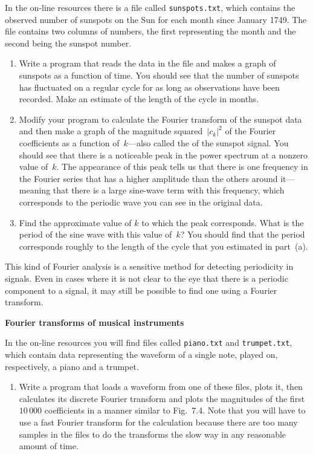 \documentclass[12pt]{article}
\begin{document}
\begin{exercises}
\exskip In the on-line resources there is a file called
\verb|sunspots.txt|, which contains the observed number of sunspots on the
Sun for each month since January 1749.  The file contains two columns of
numbers, the first representing the month and the second being the sunspot
number.
\begin{enumerate}\setlength{\itemsep}{0pt}
\item Write a program that reads the data in the file and makes a graph of
  sunspots as a function of time.  You should see that the number of
  sunspots has fluctuated on a regular cycle for as long as observations
  have been recorded.  Make an estimate of the length of the cycle in
  months.
\item Modify your program to calculate the Fourier transform of the sunspot
  data and then make a graph of the magnitude squared~$|c_k|^2$ of the
  Fourier coefficients as a function of~$k$---also called the
   of the sunspot signal.  You should see that
  there is a noticeable peak in the power spectrum at a nonzero value
  of~$k$.  The appearance of this peak tells us that there is one frequency
  in the Fourier series that has a higher amplitude than the others around
  it---meaning that there is a large sine-wave term with this frequency,
  which corresponds to the periodic wave you can see in the original data.
\item Find the approximate value of $k$ to which the peak corresponds.
  What is the period of the sine wave with this value of~$k$?  You should
  find that the period corresponds roughly to the length of the cycle that
  you estimated in part~(a).
\end{enumerate}
This kind of Fourier analysis is a sensitive method for detecting
periodicity in signals.  Even in cases where it is not clear to the eye
that there is a periodic component to a signal, it may still be possible to
find one using a Fourier transform.



\exercise \textbf{Fourier transforms of musical instruments}

\exskip In the on-line resources you will
find files called \texttt{piano.txt} and \texttt{trumpet.txt}, which
contain data representing the waveform of a single note, played on,
respectively, a piano and a trumpet.
\begin{enumerate}\setlength{\itemsep}{0pt}
\item Write a program that loads a waveform from one of these files, plots
  it, then calculates its discrete Fourier transform and plots the
  magnitudes of the first $10\,000$ coefficients in a manner similar to
  Fig.~7.4.  Note that you will have to use a fast Fourier transform for
  the calculation because there are too many samples in the files to do the
  transforms the slow way in any reasonable amount of time.


\end{enumerate}
\end{exercises}
\end{document}
